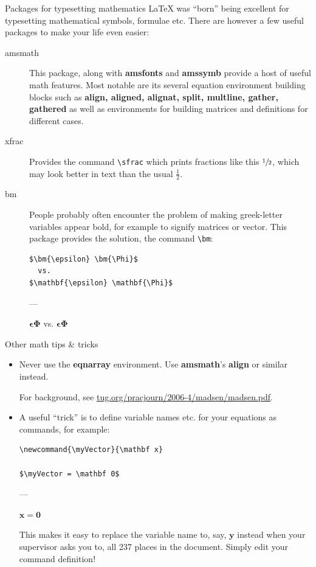 \documentclass[english]{beamer}
\begin{document}
\begin{frame}{\insertsection}{Packages for
    typesetting mathematics}
  \LaTeX{} was ``born'' being excellent for typesetting mathematical
  symbols, formulae etc. There are however a few useful packages to
  make your life even easier:
  \begin{description}
  \item[amsmath] This package, along with \textbf{amsfonts} and
    \textbf{amssymb} provide a host of useful math features. Most
    notable are its several equation environment building blocks such
    as {\bfseries align, aligned, alignat, split, multline, gather,
      gathered} as well as environments for building matrices and
    definitions for different cases.
  \item[xfrac] Provides the command \verb|\sfrac| which prints
    fractions like this $\sfrac{1}{2}$, which may look better in text
    than the usual $\frac{1}{2}$.
  \item[bm] People probably often encounter the problem of making
    greek-letter variables appear bold, for example to signify
    matrices or vector. This package provides the solution, the
    command \verb|\bm|:
\begin{verbatim}
$\bm{\epsilon} \bm{\Phi}$
  vs.
$\mathbf{\epsilon} \mathbf{\Phi}$
\end{verbatim}
    ---

    $\bm{\epsilon} \bm{\Phi}$ vs. $\mathbf{\epsilon} \mathbf{\Phi}$
  \end{description}
\end{frame}

\begin{frame}[fragile]{\insertsection}{Other math tips \& tricks}
  \begin{itemize}
  \item Never use the \textbf{eqnarray} environment. Use
    \textbf{amsmath}'s \textbf{align} or similar instead.
    
    For background, see
    \href{http://tug.org/pracjourn/2006-4/madsen/madsen.pdf}{tug.org/pracjourn/2006-4/madsen/madsen.pdf}.
  \item A useful ``trick'' is to define variable names etc. for your
    equations as commands, for example:
\begin{verbatim}
\newcommand{\myVector}{\mathbf x}

$\myVector = \mathbf 0$
\end{verbatim}
    ---

    \newcommand{\myExtremelyImportantVector}{\mathbf x}
    $\myExtremelyImportantVector = \mathbf 0$

    This makes it easy to replace the variable name to, say, $\mathbf
    y$ instead when your supervisor asks you to, all 237 places in the
    document. Simply edit your command definition!
  \end{itemize}
\end{frame}
\end{document}
